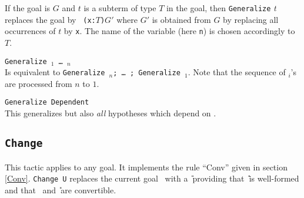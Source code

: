 If the goal is $G$ and $t$ is a subterm of type $T$
in the goal, then {\tt Generalize} \textit{t} replaces the goal by {\tt
(x:$T$)$G'$} where $G'$ is obtained from $G$ by replacing all
occurrences of $t$ by {\tt x}. The name of the variable (here {\tt n})
is chosen accordingly to $T$.

\begin{Variants}
\item {\tt Generalize \term$_1$ \dots\ \term$_n$} \\
  Is equivalent to {\tt Generalize \term$_n$; \dots\ ; Generalize
    \term$_1$}. Note that the sequence of \term$_i$'s are processed from 
    $n$ to $1$.

\item {\tt Generalize Dependent \term} \\
  This generalizes {\term} but
  also {\em all} hypotheses which depend on {\term}.

\end{Variants}

\subsection{\tt Change \term}
\label{Change}
This tactic applies to any goal. It implements the rule
``Conv'' given in section \ref{Conv}.
{\tt Change U} replaces the current goal \T\ with a \U\ providing
that \U\ is well-formed and that \T\ and \U\ are
convertible.

\begin{ErrMsgs}
\item {}
\end{ErrMsgs}


